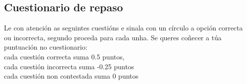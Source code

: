 %
%
%
%
%
%
%
%
%
%
\showanswers
%
%
\begin{center}
\section*{Cuestionario de repaso}\label{sec:cuestionario-1}
\end{center}

\begin{minipage}{0.85\linewidth}

 Le con atención as seguintes cuestións e sinala con un círculo a opción correcta ou incorrecta, segundo proceda para cada unha.
 Se queres coñecer a túa puntuación no cuestionario:\\
 cada cuestión correcta suma 0.5 puntos,\\
 cada cuestión incorrecta suma -0.25 puntos\\
 cada cuestión non contestada suma 0 puntos \\
%
\par
\hrulefill
\end{minipage}

